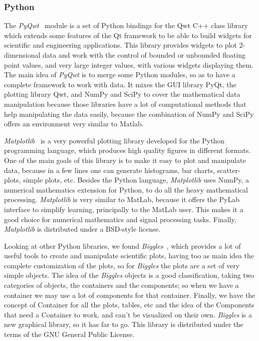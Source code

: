 \subsubsection{Python}
The \emph{PyQwt}~\cite{PyQwt} module is a set of Python bindings for the Qwt C++ class library which extends some
features of the Qt framework to be able to build widgets for scientific and engineering applications.
This library provides widgets to plot 2-dimensional data and work with the  control of bounded or unbounded floating point values, and very large integer values, with various widgets displaying them.
The main idea of \emph{PyQwt} is to merge some Python modules, so as to have a complete framework to work with
data. It mixes the GUI library PyQt, the plotting library Qwt, and NumPy and SciPy to cover the mathematical data
manipulation because those libraries have a lot of computational methods that help manipulating
the data easily, because the combination of NumPy and SciPy offers an environment very similar to Matlab.


\emph{Matplotlib}~\cite{Matplotlib} is a very powerful plotting library developed for the Python programming language, which produces high quality figures in different formats.
One of the main goals of this library is to make it easy to plot and manipulate data, because in a few lines one can generate histograms, bar charts, scatter-plots,
simple plots, etc.
Besides the Python language, \emph{Matplotlib} uses NumPy, a numerical mathematics extension for Python, to do all the heavy mathematical processing.
\emph{Matplotlib} is very similar to MatLab, because it offers the PyLab interface to simplify learning, principally to the MatLab user. This makes it
a good choice for numerical mathematics and signal processing tasks.
Finally, \emph{Matplotlib} is distributed under a BSD-style license.



Looking at other Python libraries, we found \emph{Biggles}~\cite{Biggles},
which provides a lot of useful tools to create and manipulate scientific plots, having too as main idea
the complete customization of the plots, so for \emph{Biggles} the plots are a set of very simple objects.
The idea of the \emph{Biggles} objects is a good classification, taking two categories of objects, the containers and the components; so when we have a container we
may use a lot of components for that container.
Finally, we have the concept of Container for all the plots, tables, etc and the idea of the Components that need a Container to work, and can't be visualized on their own.
\emph{Biggles} is a new graphical library, so it has far to go. This library is distributed under the terms of the GNU General Public License.

